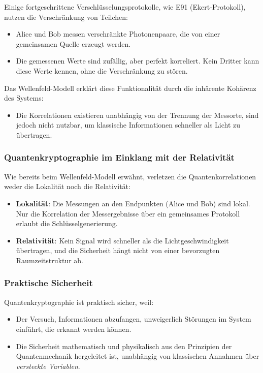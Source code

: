 \documentclass[12pt,a4paper]{article}
\begin{document}
	Einige fortgeschrittene Verschlüsselungsprotokolle, wie E91 (Ekert-Protokoll), nutzen die Verschränkung von Teilchen:
	\begin{itemize}
		\item Alice und Bob messen verschränkte Photonenpaare, die von einer gemeinsamen Quelle erzeugt werden.
		\item Die gemessenen Werte sind zufällig, aber perfekt korreliert. Kein Dritter kann diese Werte kennen, ohne die Verschränkung zu stören.
	\end{itemize}
	Das Wellenfeld-Modell erklärt diese Funktionalität durch die inhärente Kohärenz des Systems:
	\begin{itemize}
		\item Die Korrelationen existieren unabhängig von der Trennung der Messorte, sind jedoch nicht nutzbar, um klassische Informationen schneller als Licht zu übertragen.
	\end{itemize}
	
	\subsubsection{Quantenkryptographie im Einklang mit der Relativität}
	
	Wie bereits beim Wellenfeld-Modell erwähnt, verletzen die Quantenkorrelationen weder die Lokalität noch die Relativität:
	\begin{itemize}
		\item \textbf{Lokalität}: Die Messungen an den Endpunkten (Alice und Bob) sind lokal. Nur die Korrelation der Messergebnisse über ein gemeinsames Protokoll erlaubt die Schlüsselgenerierung.
		\item \textbf{Relativität}: Kein Signal wird schneller als die Lichtgeschwindigkeit übertragen, und die Sicherheit hängt nicht von einer bevorzugten Raumzeitstruktur ab.
	\end{itemize}
	
	\subsubsection{Praktische Sicherheit}
	
	Quantenkryptographie ist praktisch sicher, weil:
	\begin{itemize}
		\item Der Versuch, Informationen abzufangen, unweigerlich Störungen im System einführt, die erkannt werden können.
		\item Die Sicherheit mathematisch und physikalisch aus den Prinzipien der Quantenmechanik hergeleitet ist, unabhängig von klassischen Annahmen über \textit{versteckte Variablen}.
	\end{itemize}
	
\end{document}
